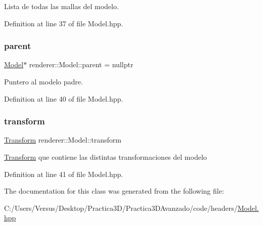 Lista de todas las mallas del modelo. 

Definition at line 37 of file Model.\+hpp.

\mbox{\label{classrenderer_1_1_model_a49de683276c3c000bea474730008bc7d}} 
\subsubsection{\texorpdfstring{parent}{parent}}
{\footnotesize\ttfamily \mbox{\hyperlink{classrenderer_1_1_model}{Model}}$\ast$ renderer\+::\+Model\+::parent = nullptr}

Puntero al modelo padre. 

Definition at line 40 of file Model.\+hpp.

\mbox{\label{classrenderer_1_1_model_a9689817daed05747058d3b919af724fd}} 
\subsubsection{\texorpdfstring{transform}{transform}}
{\footnotesize\ttfamily \mbox{\hyperlink{structrenderer_1_1_model_1_1_transform}{Transform}} renderer\+::\+Model\+::transform}

\mbox{\hyperlink{structrenderer_1_1_model_1_1_transform}{Transform}} que contiene las distintas transformaciones del modelo 

Definition at line 41 of file Model.\+hpp.



The documentation for this class was generated from the following file\+:\begin{DoxyCompactItemize}
\item 
C\+:/\+Users/\+Versus/\+Desktop/\+Practica3\+D/\+Practica3\+D\+Avanzado/code/headers/\mbox{\hyperlink{_model_8hpp}{Model.\+hpp}}\end{DoxyCompactItemize}
